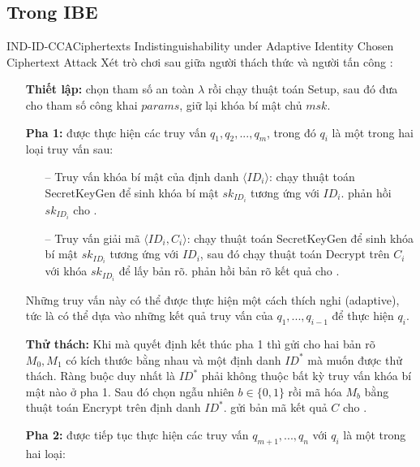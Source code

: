 \documentclass[class=report, crop=false]{standalone}
\begin{document}
		\subsection{Trong IBE}
			\begin{game}{IND-ID-CCA}{Ciphertexts Indistinguishability under Adaptive Identity Chosen Ciphertext Attack}
				Xét trò chơi sau giữa người thách thức \challenger và người tấn công \adversary:
				\vspace{-1.8\baselineskip}
				\begin{itemize}[leftmargin=1.5cm, itemindent=-0.5cm]
					\item[] \textbf{Thiết lập:} \challenger chọn tham số an toàn $\lambda$ rồi chạy thuật toán \textsf{Setup}, sau đó đưa cho \adversary tham số công khai $params$, giữ lại khóa bí mật chủ $msk$.
					\item[] \textbf{Pha 1:} \adversary được thực hiện các truy vấn $q_1, q_2, ..., q_m$, trong đó $q_i$ là một trong hai loại truy vấn sau:
					\begin{itemize}
						\item[--] Truy vấn khóa bí mật của định danh $\langle ID_i \rangle$: \challenger chạy thuật toán \textsf{SecretKeyGen} để sinh khóa bí mật $sk_{ID_i}$ tương ứng với $ID_i$. \challenger phản hồi $sk_{ID_i}$ cho \adversary .
						\item[--] Truy vấn giải mã $\langle ID_i, C_i \rangle$: \challenger chạy thuật toán \textsf{SecretKeyGen} để sinh khóa bí mật $sk_{ID_i}$ tương ứng với $ID_i$, sau đó chạy thuật toán \textsf{Decrypt} trên $C_i$ với khóa $sk_{ID_i}$ để lấy bản rõ. \challenger phản hồi bản rõ kết quả cho \adversary .
					\end{itemize}
					Những truy vấn này có thể được thực hiện một cách thích nghi (adaptive), tức là \adversary có thể dựa vào những kết quả truy vấn của $q_1, ..., q_{i - 1}$ để thực hiện $q_i$.
					\item[] \textbf{Thử thách:} Khi mà \adversary quyết định kết thúc pha 1 thì \adversary gửi cho \challenger hai bản rõ $M_0, M_1$ có kích thước bằng nhau và một định danh $ID^*$ mà \adversary muốn được thử thách. Ràng buộc duy nhất là $ID^*$ phải không thuộc bất kỳ truy vấn khóa bí mật nào ở pha 1. Sau đó \challenger chọn ngẫu nhiên $b \in \{0, 1\}$ rồi mã hóa $M_b$ bằng thuật toán \textsf{Encrypt} trên định danh $ID^*$. \challenger gửi bản mã kết quả $C$ cho \adversary.
					\item[] \textbf{Pha 2:} \adversary được tiếp tục thực hiện các truy vấn $q_{m + 1}, ..., q_{n}$ với $q_i$ là một trong hai loại:

\end{itemize}
\end{game}
\end{document}
